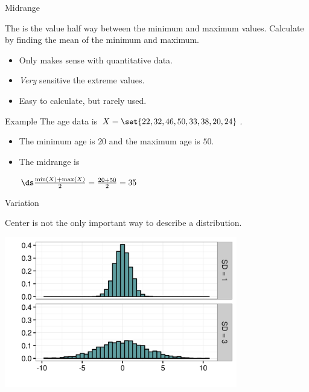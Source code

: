 \documentclass[xcolor=table, aspectratio=169, bigger]{beamer}
\begin{document}
\begin{frame}{Midrange}
\begin{block}{}
The  is the value half way between the minimum and maximum values. Calculate by finding the mean of the minimum and maximum.
\begin{itemize}
\item Only makes sense with quantitative data.
\item \emph{Very} sensitive the extreme values.
\item Easy to calculate, but rarely used.
\end{itemize}
\end{block}

\pause
\begin{exampleblock}{Example}
The age data is $X = \set{22, 32, 46, 50, 33, 38, 20, 24}$.
\begin{itemize}
\item The minimum age is $20$ and the maximum age is $50$.
\item The midrange is \\
\smallskip
{\centering
$\ds \frac {\min(X) + \max(X)}{2} = \frac {20 + 50}{2} = 35$
\par}
\end{itemize}
\smallskip
\end{exampleblock}

\end{frame}

\begin{frame}{Variation}
\begin{block}{}
Center is not the only important way to describe a distribution.
\end{block}
\pause
\bigskip
{\centering
\includegraphics[width=4in]{../images/wk04_var_diff}
\par}
\end{frame}
\end{document}
